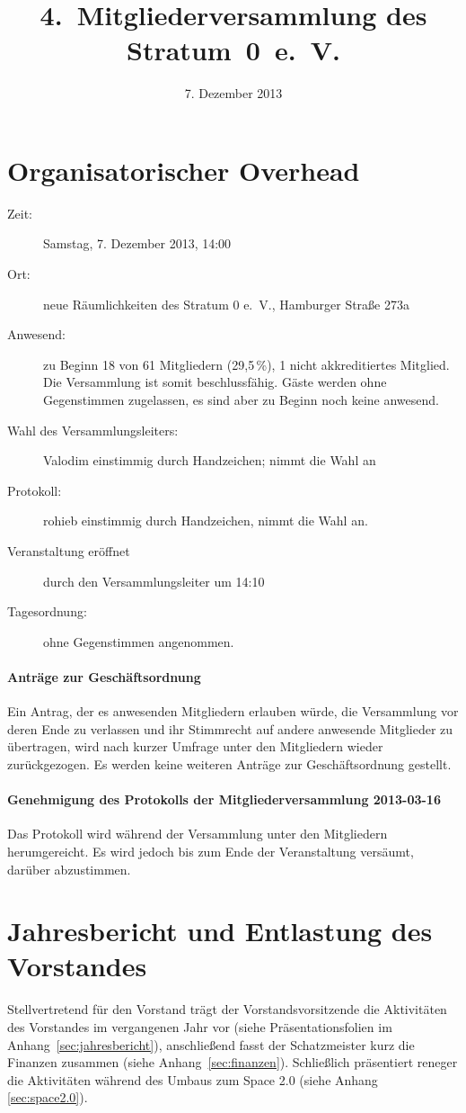 \documentclass[a4paper,12pt]{scrartcl}
\title{4.~Mitgliederversammlung des Stratum~0~e.~V.}
\date{7. Dezember 2013}
\begin{document}
\maketitle

\section{Organisatorischer Overhead}
\begin{description}
  \item[Zeit:] Samstag, 7. Dezember 2013, 14:00
  \item[Ort:] neue Räumlichkeiten des Stratum 0 e.~V., Hamburger Straße 273a
  \item[Anwesend:] zu Beginn 18 von 61 Mitgliedern (29{,}5\,\%), 1 nicht
    akkreditiertes Mitglied. Die Versammlung ist somit beschlussfähig. Gäste
    werden ohne Gegenstimmen zugelassen, es sind aber zu Beginn noch keine
    anwesend.
  \item[Wahl des Versammlungsleiters:] Valodim einstimmig durch Handzeichen;
    nimmt die Wahl an
  \item[Protokoll:] rohieb einstimmig durch Handzeichen, nimmt die Wahl an.
  \item[Veranstaltung eröffnet] durch den Versammlungsleiter um 14:10
  \item[Tagesordnung:] ohne Gegenstimmen angenommen.
\end{description}

\paragraph{Anträge zur Geschäftsordnung} Ein Antrag, der es anwesenden
Mitgliedern erlauben würde, die Versammlung vor deren Ende zu verlassen und ihr
Stimmrecht auf andere anwesende Mitglieder zu übertragen, wird nach kurzer
Umfrage unter den Mitgliedern wieder zurückgezogen. Es werden keine weiteren
Anträge zur Geschäftsordnung gestellt.

\paragraph{Genehmigung des Protokolls der Mitgliederversammlung 2013-03-16} Das
Protokoll wird während der Versammlung unter den Mitgliedern herumgereicht. Es
wird jedoch bis zum Ende der Veranstaltung versäumt, darüber abzustimmen.


\section{Jahresbericht und Entlastung des Vorstandes}
Stellvertretend für den Vorstand trägt der Vorstandsvorsitzende die Aktivitäten
des Vorstandes im vergangenen Jahr vor (siehe Präsentationsfolien im
Anhang~\ref{sec:jahresbericht}), anschließend fasst der Schatzmeister kurz die
Finanzen zusammen (siehe Anhang~\ref{sec:finanzen}). Schließlich präsentiert
reneger die Aktivitäten während des Umbaus zum Space 2.0 (siehe
Anhang \ref{sec:space2.0}).
\end{document}

